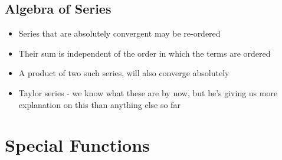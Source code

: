 \documentclass[cplx.tex]{subfiles}
\begin{document}
\section{Algebra of Series}
\begin{itemize}
    \item Series that are absolutely convergent may be re-ordered
    \item Their sum is independent of the order in which the terms are ordered
    \item A product of two such series, will also converge absolutely
    \item Taylor series - we know what these are by now, but he's giving us more explanation on this than anything else so far
\end{itemize}

\chapter{Special Functions}
\end{document}
